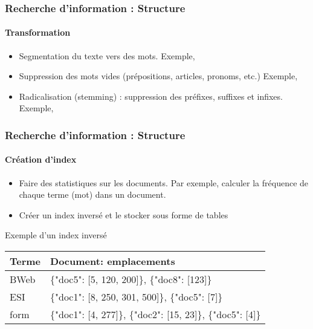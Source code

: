\documentclass[xcolor=table]{beamer}
\begin{document}
\begin{frame}
\frametitle{Recherche d'information : Structure}
\framesubtitle{Transformation}

\begin{itemize}
	\item Segmentation du texte vers des mots. 
	Exemple, 
	
	\item Suppression des mots vides (prépositions, articles, pronoms, etc.)
	Exemple, 
	
	\item Radicalisation (stemming) : suppression des préfixes, suffixes et infixes. 
	Exemple, 
\end{itemize}

\end{frame}

\begin{frame}
\frametitle{Recherche d'information : Structure}
\framesubtitle{Création d'index}

\begin{itemize}
	\item Faire des statistiques sur les documents. 
	Par exemple, calculer la fréquence de chaque terme (mot) dans un document. 
	\item Créer un index inversé et le stocker sous forme de tables
\end{itemize}

\begin{exampleblock}{Exemple d'un index inversé}
	\begin{tabular}{|l|l|}
		\hline
		\textbf{Terme} & \textbf{Document: emplacements} \\
		\hline
		BWeb & \{"doc5": [5, 120, 200]\}, \{"doc8": [123]\} \\\hline
		ESI & \{"doc1": [8, 250, 301, 500]\}, \{"doc5": [7]\}\\\hline
		form & \{"doc1": [4, 277]\}, \{"doc2": [15, 23]\}, \{"doc5": [4]\}\\
		\hline
	\end{tabular}
\end{exampleblock}

\end{frame}
\end{document}
